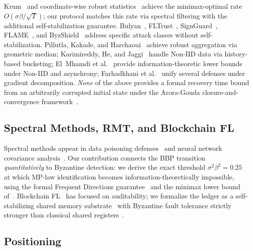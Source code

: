 Krum~\cite{krum} and coordinate-wise robust statistics~\cite{byzantine_ml} achieve the
minimax-optimal rate $O(\sigma\beta/\sqrt{T})$; our protocol matches this rate via spectral
filtering with the additional self-stabilization guarantee.
Bulyan~\cite{bulyan}, FLTrust~\cite{crfl}, SignGuard~\cite{signguard}, FLAME~\cite{flame},
and ByzShield~\cite{byzshield} address specific attack classes without self-stabilization.
Pillutla, Kakade, and Harchaoui~\cite{geometric_median} achieve robust aggregation via
geometric median; Karimireddy, He, and Jaggi~\cite{karimireddy_bucketing} handle Non-IID
data via history-based bucketing; El~Mhamdi et al.~\cite{elmhamdi_jungle} provide
information-theoretic lower bounds under Non-IID and asynchrony;
Farhadkhani et al.~\cite{farhadkhani_byzsgd} unify several defenses under gradient
decomposition.
\emph{None} of the above provides a formal recovery time bound from an arbitrarily
corrupted initial state under the Arora-Gouda closure-and-convergence framework~\cite{arora_gouda}.

\subsection{Spectral Methods, RMT, and Blockchain FL}

Spectral methods appear in data poisoning defenses~\cite{steinhardt_certified} and neural
network covariance analysis~\cite{rmt_gradients,rmt_neural,spectral_analysis}.
Our contribution connects the BBP transition~\cite{bbp_transition} \emph{quantitatively}
to Byzantine detection: we derive the exact threshold $\sigma^2\beta^2 = 0.25$ at which
MP-law identification becomes information-theoretically impossible, using the formal
Frequent Directions guarantee~\cite{ghashami_fd} and the minimax lower bound
of~\cite{byzantine_ml}.
Blockchain FL~\cite{blockchain_fl,blockchain_smart} has focused on auditability; we
formalize the ledger as a self-stabilizing shared memory substrate~\cite{garay_backbone}
with Byzantine fault tolerance strictly stronger than classical shared registers~\cite{awerbuch_varghese}.

\subsection{Positioning}

